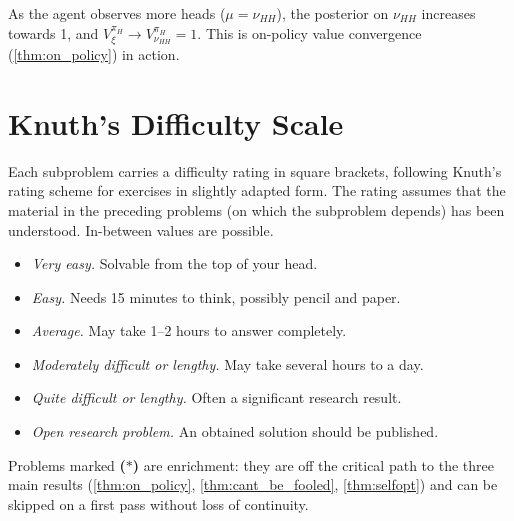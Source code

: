 \documentclass[fontsize=11pt, parskip=half]{scrartcl}
\begin{document}
As the agent observes more heads ($\mu = \nu_{HH}$), the posterior on $\nu_{HH}$ increases towards 1, and $V_\xi^{\pi_H} \to V_{\nu_{HH}}^{\pi_H} = 1$. This is on-policy value convergence (\cref{thm:on_policy}) in action.


\section{Knuth's Difficulty Scale}\label{sec:appendix_difficulty}

Each subproblem carries a difficulty rating in square brackets, following Knuth's rating scheme for exercises \cite{Knuth:73a} in slightly adapted form. The rating assumes that the material in the preceding problems (on which the subproblem depends) has been understood. In-between values are possible.

\begin{itemize}\itemsep=2pt
    \item[\textbf{[00]}] \emph{Very easy.} Solvable from the top of your head.
    \item[\textbf{[10]}] \emph{Easy.} Needs 15 minutes to think, possibly pencil and paper.
    \item[\textbf{[20]}] \emph{Average.} May take 1--2 hours to answer completely.
    \item[\textbf{[30]}] \emph{Moderately difficult or lengthy.} May take several hours to a day.
    \item[\textbf{[40]}] \emph{Quite difficult or lengthy.} Often a significant research result.
    \item[\textbf{[50]}] \emph{Open research problem.} An obtained solution should be published.
\end{itemize}

Problems marked \textbf{($\ast$)} are enrichment: they are off the critical path to the three main results (\cref{thm:on_policy}, \cref{thm:cant_be_fooled}, \cref{thm:selfopt}) and can be skipped on a first pass without loss of continuity.


\clearpage


\end{document}

